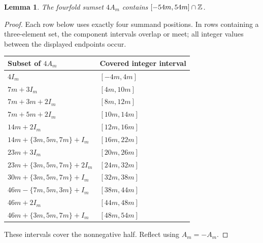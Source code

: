 \documentclass[11pt,a4paper]{article}
\newtheorem{lemma}[theorem]{Lemma}
\theoremstyle{remark}\newtheorem{remark}[theorem]{Remark}
\begin{document}
\begin{lemma}\label{lem:coverfamily}
The fourfold sumset $4A_m$ contains $[-54m,54m]\cap\mathbb Z$.
\end{lemma}
\begin{proof}
Each row below uses exactly four summand positions. In rows containing a three-element set, the component intervals overlap or meet; all integer values between the displayed endpoints occur.
\begin{center}
\begin{tabular}{ll}
\toprule
Subset of $4A_m$ & Covered integer interval\\\midrule
$4I_m$ & $[-4m,4m]$\\
$7m+3I_m$ & $[4m,10m]$\\
$7m+3m+2I_m$ & $[8m,12m]$\\
$7m+5m+2I_m$ & $[10m,14m]$\\
$14m+2I_m$ & $[12m,16m]$\\
$14m+\{3m,5m,7m\}+I_m$ & $[16m,22m]$\\
$23m+3I_m$ & $[20m,26m]$\\
$23m+\{3m,5m,7m\}+2I_m$ & $[24m,32m]$\\
$30m+\{3m,5m,7m\}+I_m$ & $[32m,38m]$\\
$46m-\{7m,5m,3m\}+I_m$ & $[38m,44m]$\\
$46m+2I_m$ & $[44m,48m]$\\
$46m+\{3m,5m,7m\}+I_m$ & $[48m,54m]$\\\bottomrule
\end{tabular}
\end{center}
These intervals cover the nonnegative half. Reflect using $A_m=-A_m$.
\end{proof}
\end{document}
